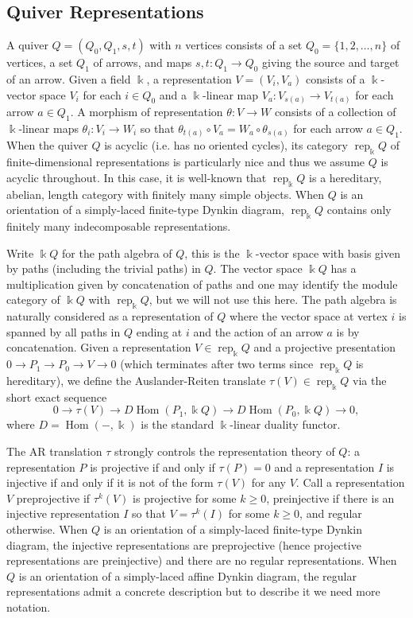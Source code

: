 \documentclass[12pt]{amsart}
\newcommand{\sayDR}[1]{\say[DR]{\color{red}{\bf DR:}\;#1}}
\newcommand{\kk}{\Bbbk}%
\newcommand{\rep}{\operatorname{rep}}
\DeclareMathOperator{\Hom}{Hom}
\theoremstyle{remark}
\numberwithin{equation}{section}
\begin{document}
\subsection{Quiver Representations}
A quiver $Q=(Q_0,Q_1,s,t)$ with $n$ vertices consists of a set $Q_0=\{1,2,\ldots,n\}$ of vertices, a set $Q_1$ of arrows, and maps $s,t:Q_1\to Q_0$ giving the source and target of an arrow.  
Given a field $\kk$, a representation $V=(V_i,V_a)$ consists of a $\kk$-vector space $V_i$ for each $i\in Q_0$ and a $\kk$-linear map $V_a:V_{s(a)}\to V_{t(a)}$ for each arrow $a\in Q_1$.  
A morphism of representation $\theta:V\to W$ consists of a collection of $\kk$-linear maps $\theta_i:V_i\to W_i$ so that $\theta_{t(a)}\circ V_a=W_a\circ \theta_{s(a)}$ for each arrow $a\in Q_1$.  
When the quiver $Q$ is acyclic (i.e. has no oriented cycles), its category $\rep_\kk Q$ of finite-dimensional representations is particularly nice and thus we assume $Q$ is acyclic throughout.  
In this case, it is well-known that $\rep_\kk Q$ is a hereditary, abelian, length category with finitely many simple objects.  
When $Q$ is an orientation of a simply-laced finite-type Dynkin diagram, $\rep_\kk Q$ contains only finitely many indecomposable representations.

Write $\kk Q$ for the path algebra of $Q$, this is the $\kk$-vector space with basis given by paths (including the trivial paths) in $Q$.  
The vector space $\kk Q$ has a multiplication given by concatenation of paths and one may identify the module category of $\kk Q$ with $\rep_\kk Q$, but we will not use this here.  
The path algebra is naturally considered as a representation of $Q$ where the vector space at vertex $i$ is spanned by all paths in $Q$ ending at $i$ and the action of an arrow $a$ is by concatenation.  
Given a representation $V\in\rep_\kk Q$ and a projective presentation $0\to P_1\to P_0\to V\to 0$ (which terminates after two terms since $\rep_\kk Q$ is hereditary), we define the Auslander-Reiten translate $\tau(V)\in\rep_\kk Q$ via the short exact sequence
\begin{equation}\label{eq:AR translation}
  0\longrightarrow \tau(V)\longrightarrow D\Hom(P_1,\kk Q)\longrightarrow D\Hom(P_0,\kk Q)\longrightarrow 0,
\end{equation}
where $D=\Hom(-,\kk)$ is the standard $\kk$-linear duality functor.

The AR translation $\tau$ strongly controls the representation theory of $Q$: a representation $P$ is projective if and only if $\tau(P)=0$ and a representation $I$ is injective if and only if it is not of the form $\tau(V)$ for any $V$.  
Call a representation $V$ preprojective if $\tau^k(V)$ is projective for some $k\ge0$, preinjective\sayDR{post?} if there is an injective representation $I$ so that $V=\tau^k(I)$ for some $k\ge0$, and regular otherwise.  
When $Q$ is an orientation of a simply-laced finite-type Dynkin diagram, the injective representations are preprojective (hence projective representations are preinjective) and there are no regular representations.  
When $Q$ is an orientation of a simply-laced affine Dynkin diagram, the regular representations admit a concrete description but to describe it we need more notation.
\end{document}
